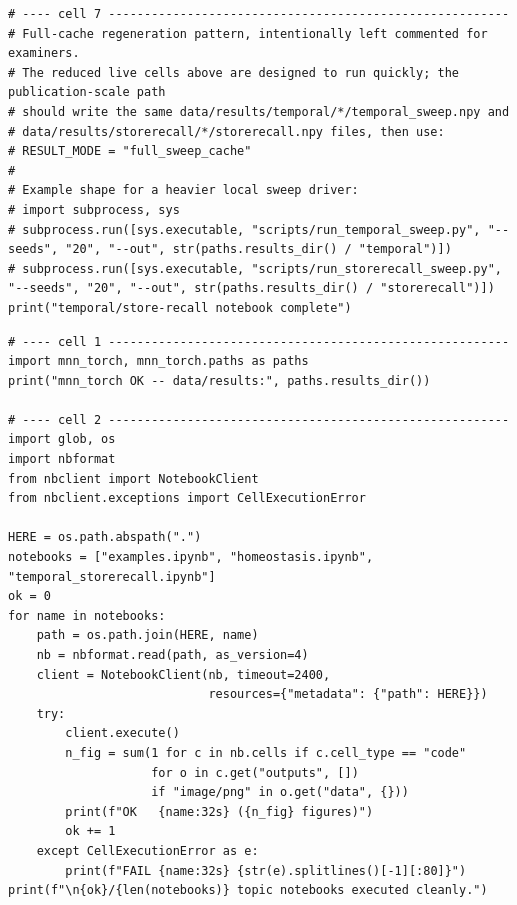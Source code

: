 \begin{lstlisting}[caption={experiments/temporal\_storerecall.ipynb},label={lst:mnn-nb-temporal-storerecall}]
# ---- cell 7 --------------------------------------------------------
# Full-cache regeneration pattern, intentionally left commented for examiners.
# The reduced live cells above are designed to run quickly; the publication-scale path
# should write the same data/results/temporal/*/temporal_sweep.npy and
# data/results/storerecall/*/storerecall.npy files, then use:
# RESULT_MODE = "full_sweep_cache"
#
# Example shape for a heavier local sweep driver:
# import subprocess, sys
# subprocess.run([sys.executable, "scripts/run_temporal_sweep.py", "--seeds", "20", "--out", str(paths.results_dir() / "temporal")])
# subprocess.run([sys.executable, "scripts/run_storerecall_sweep.py", "--seeds", "20", "--out", str(paths.results_dir() / "storerecall")])
print("temporal/store-recall notebook complete")
\end{lstlisting}

\begin{lstlisting}[caption={experiments/REPRODUCE\_ALL.ipynb},label={lst:mnn-nb-REPRODUCE-ALL}]
# ---- cell 1 --------------------------------------------------------
import mnn_torch, mnn_torch.paths as paths
print("mnn_torch OK -- data/results:", paths.results_dir())

# ---- cell 2 --------------------------------------------------------
import glob, os
import nbformat
from nbclient import NotebookClient
from nbclient.exceptions import CellExecutionError

HERE = os.path.abspath(".")
notebooks = ["examples.ipynb", "homeostasis.ipynb", "temporal_storerecall.ipynb"]
ok = 0
for name in notebooks:
    path = os.path.join(HERE, name)
    nb = nbformat.read(path, as_version=4)
    client = NotebookClient(nb, timeout=2400,
                            resources={"metadata": {"path": HERE}})
    try:
        client.execute()
        n_fig = sum(1 for c in nb.cells if c.cell_type == "code"
                    for o in c.get("outputs", [])
                    if "image/png" in o.get("data", {}))
        print(f"OK   {name:32s} ({n_fig} figures)")
        ok += 1
    except CellExecutionError as e:
        print(f"FAIL {name:32s} {str(e).splitlines()[-1][:80]}")
print(f"\n{ok}/{len(notebooks)} topic notebooks executed cleanly.")
\end{lstlisting}
